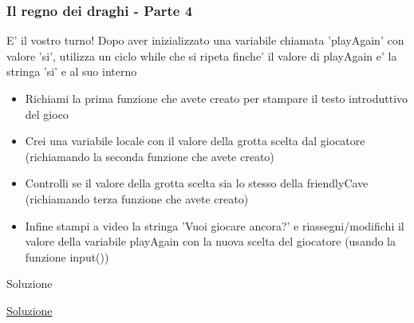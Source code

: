 \begin{frame}[fragile]
\frametitle{Il regno dei draghi - Parte 4}

\begin{block}{E' il vostro turno!}
Dopo aver inizializzato una variabile chiamata 'playAgain' con valore 'si', utilizza un ciclo while che si ripeta finche' il valore di playAgain e' la stringa 'si' e al suo interno
    \begin{itemize}
        \item Richiami la prima funzione che avete creato per stampare il testo introduttivo del gioco
        \item Crei una variabile locale con il valore della grotta scelta dal giocatore (richiamando la seconda funzione che avete creato)
        \item Controlli se il valore della grotta scelta sia lo stesso della friendlyCave (richiamando terza funzione che avete creato)
        \item Infine stampi a video la stringa 'Vuoi giocare ancora?' e riassegni/modifichi il valore della variabile playAgain con la nuova scelta del giocatore (usando la funzione input())
    \end{itemize}
\end{block}
\end{frame}

\begin{frame}{Soluzione}
    \begin{center}
        \href{https://raw.githubusercontent.com/ragazzedigitalicesena/slide-2019/master/tex/chapter_5-8/ilRegniDeiDraghi.py}{Soluzione}
    \end{center}
\end{frame}{}